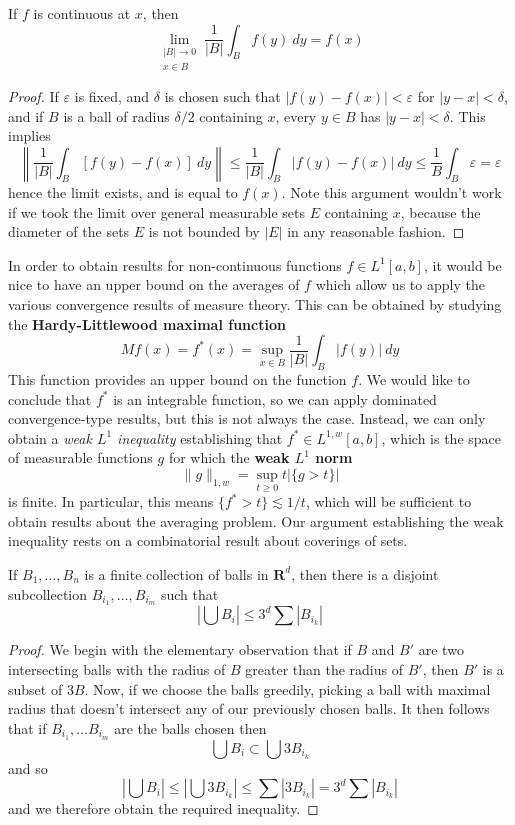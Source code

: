 \begin{lemma}
    If $f$ is continuous at $x$, then
    \[ \lim_{\substack{|B| \to 0\\x \in B}} \frac{1}{|B|} \int_B f(y)\ dy = f(x) \]
\end{lemma}
\begin{proof}
    If $\varepsilon$ is fixed, and $\delta$ is chosen such that $|f(y) - f(x)| < \varepsilon$ for $|y - x| < \delta$, and if $B$ is a ball of radius $\delta/2$ containing $x$, every $y \in B$ has $|y - x| < \delta$. This implies
    \[ \left\| \frac{1}{|B|} \int_B [f(y) - f(x)]\ dy \right\| \leq \frac{1}{|B|} \int_B |f(y) - f(x)|\ dy \leq \frac{1}{B} \int_B \varepsilon = \varepsilon \]
    hence the limit exists, and is equal to $f(x)$. Note this argument wouldn't work if we took the limit over general measurable sets $E$ containing $x$, because the diameter of the sets $E$ is not bounded by $|E|$ in any reasonable fashion.
\end{proof}

In order to obtain results for non-continuous functions $f \in L^1[a,b]$, it would be nice to have an upper bound on the averages of $f$ which allow us to apply the various convergence results of measure theory. This can be obtained by studying the {\bf Hardy-Littlewood maximal function}
%
\[ Mf(x) = f^*(x) = \sup_{x \in B} \frac{1}{|B|} \int_B |f(y)|\ dy \]
%
This function provides an upper bound on the function $f$. We would like to conclude that $f^*$ is an integrable function, so we can apply dominated convergence-type results, but this is not always the case. Instead, we can only obtain a {\it weak $L^1$ inequality} establishing that $f^* \in L^{1,w}[a,b]$, which is the space of measurable functions $g$ for which the {\bf weak $L^1$ norm}
%
\[ \| g \|_{1,w} = \sup_{t \geq 0} t |\{ g > t \}| \]
%
is finite. In particular, this means $\{ f^* > t \} \lesssim 1/t$, which will be sufficient to obtain results about the averaging problem. Our argument establishing the weak inequality rests on a combinatorial result about coverings of sets.

\begin{lemma}
    If $B_1, \dots, B_n$ is a finite collection of balls in $\mathbf{R}^d$, then there is a disjoint subcollection $B_{i_1}, \dots, B_{i_m}$ such that
    \[ \left| \bigcup B_i \right| \leq 3^d \sum |B_{i_k}| \]
\end{lemma}
\begin{proof}
    We begin with the elementary observation that if $B$ and $B'$ are two intersecting balls with the radius of $B$ greater than the radius of $B'$, then $B'$ is a subset of $3B$. Now, if we choose the balls greedily, picking a ball with maximal radius that doesn't intersect any of our previously chosen balls. It then follows that if $B_{i_1}, \dots B_{i_m}$ are the balls chosen then
    \[ \bigcup B_i \subset \bigcup 3B_{i_k} \]
    and so
    \[ \left| \bigcup B_i \right| \leq \left| \bigcup 3B_{i_k} \right| \leq \sum |3B_{i_k}| = 3^d \sum |B_{i_k}| \]
    and we therefore obtain the required inequality.
\end{proof}

